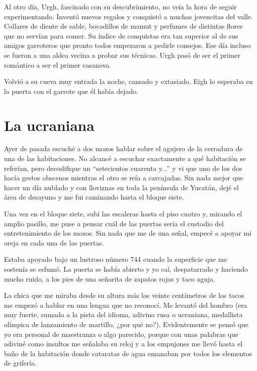 \documentclass[11pt,twoside,openright,a6paper]{book}
\begin{document}
Al otro día, Urgh, fascinado con su descubrimiento, no veía la hora de seguir experimentando. Inventó nuevos regalos y conquistó a muchas jovencitas del valle. Collares de diente de sable, bocadillos de mamut y perfumes de distintas flores que no servían para comer. Su índice de conquistas era tan superior al de sus amigos garroteros que pronto todos empezaron a pedirle consejos. Ese día incluso se fueron a una aldea vecina a probar sus técnicas. Urgh pasó de ser el primer romántico a ser el primer casanova. 

Volvió a su cueva muy entrada la noche, cansado y extasiado. Eigh lo esperaba en la puerta con el garrote que él había dejado.

\chapter*{La ucraniana}


Ayer de pasada escuché a dos mozos hablar sobre el agujero de la cerradura de
una de las habitaciones. No alcancé a escuchar exactamente a qué habitación
se referían, pero decodifique un “setecientos cuarenta y...” y vi que uno
de los dos hacía gestos obscenos mientras el otro se reía a carcajadas. Sin
nada mejor que hacer un día nublado y con lloviznas en toda la península de
Yucatán, dejé el área de desayuno y me fui caminando hasta el bloque siete.

Una vez en el bloque siete, subí las escaleras hasta el piso cuatro y,
mirando el amplio pasillo, me puse a pensar cuál de las puertas sería el
custodio del entretenimiento de los mozos. Sin nada que me de una señal,
empecé a apoyar mi oreja en cada una de las puertas.

Estaba apoyado bajo un lustroso número 744 cuando la superficie que me
sostenía se esfumó. La puerta se había abierto y yo caí, despatarrado
y haciendo mucho ruido, a los pies de una señorita de zapatos rojos y
taco aguja.

La chica que me miraba desde su altura más los veinte centímetros de
los tacos me empezó a hablar en una lengua que no reconocí. Me levantó
del hombro (era muy fuerte, sumado a la pista del idioma, adivino rusa o
ucraniana, medallista olímpica de lanzamiento de martillo, ¿por qué
no?). Evidentemente se pensó que yo era personal de maestranza o algo
parecido, porque con unas palabras que adiviné como insultos me señalaba
su reloj y a los empujones me llevó hasta el baño de la habitación donde
cataratas de agua emanaban por todos los elementos de grifería.
\end{document}
